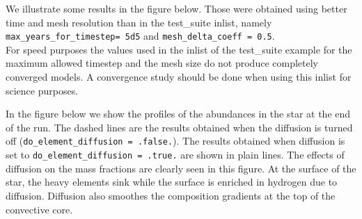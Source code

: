 \documentclass{article}
\begin{document}
  We illustrate some results in the figure below. Those were obtained using better time and mesh resolution than in the test\_suite inlist, namely \texttt{max\_years\_for\_timestep= 5d5} and \texttt{mesh\_delta\_coeff = 0.5}.\\
       
For speed purposes the values used in the inlist of the test\_suite example for the maximum allowed timestep and the mesh size do not produce completely converged models.  A convergence study should be done when using this inlist for science purposes.\\       

\pagebreak
        
          In the figure below we show the profiles of the abundances in the star at the end of the run. The dashed lines are the results obtained when the diffusion is turned off  (\texttt{do\_element\_diffusion = .false.}). The results obtained when diffusion is set to  \texttt{do\_element\_diffusion = .true.} are shown in plain lines. The effects of diffusion on the mass fractions are clearly seen in this figure.  At the surface of the star, the heavy elements sink while the surface is enriched in hydrogen due to diffusion.  Diffusion also smoothes the composition gradients at the top of the convective core.       
                  
\end{document}
